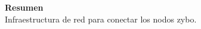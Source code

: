 \begin{center}
	\bigskip
	\bigskip
	\textbf{\huge {Resumen}}\\
	\bigskip
	Infraestructura de red para conectar los nodos zybo.
\end{center}

